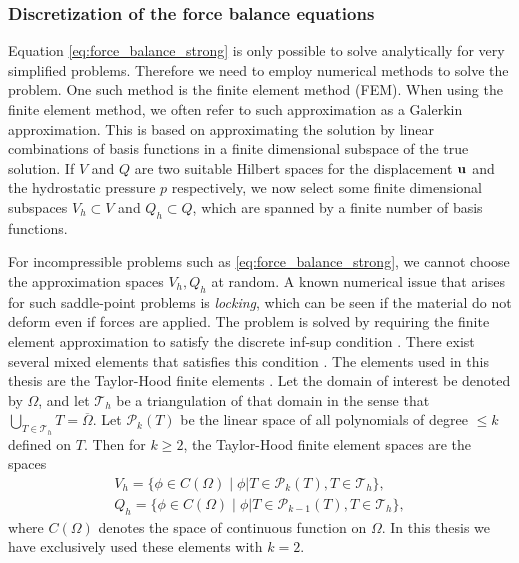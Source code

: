 \subsubsection{Discretization of the force balance equations}

Equation \eqref{eq:force_balance_strong} is only possible to solve
analytically for very simplified problems. Therefore we need to employ
numerical methods to solve the problem. One such method
is the finite element method (FEM). When using the finite element method, we often refer to such
approximation as a Galerkin approximation. This is based on
approximating the solution by linear combinations of  basis functions in a finite dimensional
subspace of the true solution. If $V$ and $Q$ are two suitable Hilbert
spaces for the displacement $\mathbf{u}$ and the hydrostatic pressure $p$
respectively, we now select some finite dimensional subspaces $V_h
\subset V$ and $Q_h \subset Q$, which are spanned by a finite number
of basis functions. 


For incompressible problems such as \eqref{eq:force_balance_strong}, we cannot choose the
approximation spaces $V_h, Q_h$ at random. A known numerical issue
that arises for such saddle-point problems is \emph{locking}, which can be
seen if the material do not deform even if forces are applied. The
problem is solved by requiring the finite element approximation to
satisfy the discrete inf-sup condition \cite{le1982existence}. There
exist several mixed elements that satisfies this condition
\cite{chapelle1993inf}. The elements used in this thesis are the
Taylor-Hood finite elements \cite{taylor1973numerical}. Let the domain of
interest be denoted by $\Omega$, and let $\mathcal{T}_h$ be a
triangulation of that domain in the sense that $\bigcup_{T \in
  \mathcal{T}_h} T = \overline{\Omega}$. Let $\mathcal{P}_k
(T)$ be the linear space of all polynomials of degree $\leq k$ defined
on $T$. Then for $k \geq 2$, the Taylor-Hood finite element spaces are the spaces
\begin{align}
  V_h = \{  \phi \in C(\Omega) \;  | \; \phi \big| T  \in \mathcal{P}_k (T) , T \in \mathcal{T}_h \},\\
  Q_h = \{  \phi \in C(\Omega) \;  | \; \phi \big| T  \in \mathcal{P}_{k-1} (T) , T \in \mathcal{T}_h \},
\end{align}
where $C(\Omega)$ denotes the space of continuous function on
$\Omega$. In this thesis we have exclusively used these elements with
$k = 2$.



